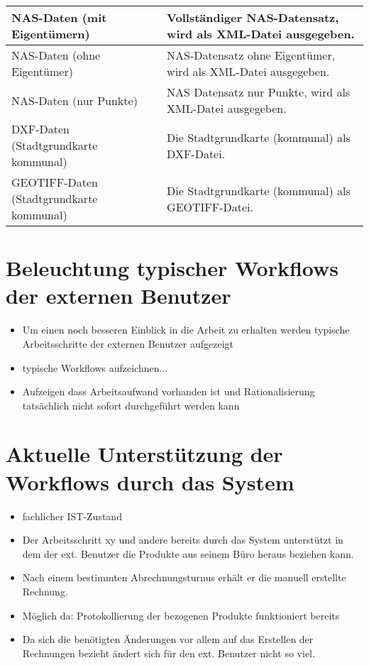 \begin{longtable}{|p{}|p{}|}
	\hline
	\acs{NAS}-Daten (mit Eigentümern)
	&
	Vollständiger \acs{NAS}-Datensatz, wird als \acs{XML}-Datei ausgegeben. \\
	\hline
	\acs{NAS}-Daten (ohne Eigentümer)
	&
	\acs{NAS}-Datensatz ohne Eigentümer, wird als \acs{XML}-Datei ausgegeben. \\
	\hline
	\acs{NAS}-Daten (nur Punkte)
	&
	\acs{NAS} Datensatz nur Punkte, wird als \acs{XML}-Datei ausgegeben. \\
	\hline
	\acs{DXF}-Daten (Stadtgrundkarte kommunal)
	&
	Die Stadtgrundkarte (kommunal) als \acs{DXF}-Datei.  \\
	\hline
	GEOTIFF-Daten (Stadtgrundkarte kommunal)
	&
	Die Stadtgrundkarte (kommunal) als GEOTIFF-Datei. \\
	\hline
			
\end{longtable} 

\section{Beleuchtung typischer Workflows der externen Benutzer}
\begin{itemize}
	\item Um einen noch besseren Einblick in die Arbeit zu erhalten werden typische Arbeitsschritte der externen Benutzer aufgezeigt
	\item typische Workflows aufzeichnen...
	\item Aufzeigen dass Arbeitsaufwand vorhanden ist und Rationalisierung tatsächlich nicht sofort durchgeführt werden kann
\end{itemize}

\section{Aktuelle Unterstützung der Workflows durch das System}
\begin{itemize}
	\item fachlicher IST-Zustand
	\item Der Arbeitsschritt xy und andere bereits durch das System unterstützt in dem der ext. Benutzer die Produkte aus seinem Büro heraus beziehen kann.
	\item Nach einem bestimmten Abrechnungsturnus erhält er die manuell erstellte Rechnung.
	\item Möglich da: Protokollierung der bezogenen Produkte funktioniert bereits
	\item Da sich die benötigten Änderungen vor allem auf das Erstellen der Rechnungen bezieht ändert sich für den ext. Benutzer nicht so viel.
\end{itemize}









